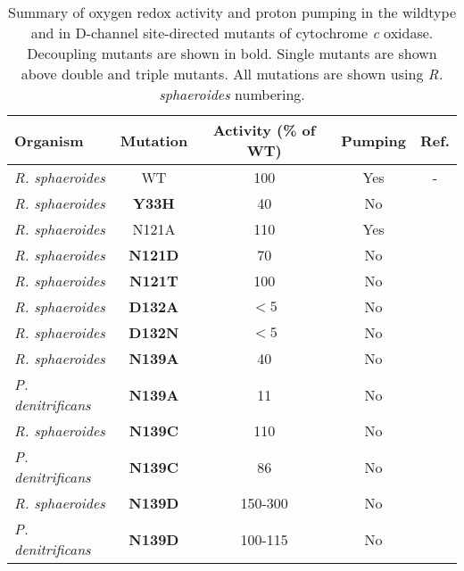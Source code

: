 \begin{table}
    \begin{center}
    \begin{singlespaced}
    \caption{Summary of oxygen redox activity and proton pumping in the wildtype and in D-channel site-directed mutants of cytochrome \emph{c} oxidase. Decoupling mutants are shown in bold. Single mutants are shown above double and triple mutants. All mutations are shown using \emph{R. sphaeroides} numbering.}
    \vspace{10pt}
    \label{tbl:dchannel_mutations}
    \footnotesize{
    \begin{tabular}{l|c|c|c|c}
    Organism  & Mutation & Activity (\% of WT) & Pumping & Ref. \\
    \hline
    \emph{R. sphaeroides} & WT & 100 & Yes & - \\
    \emph{R. sphaeroides} & \textbf{Y33H} & 40 & No & \cite{Namslauer:2010p9850} \\
    \emph{R. sphaeroides} & N121A & 110 & Yes & \cite{Zhu:2010p8237} \\
    \emph{R. sphaeroides} & \textbf{N121D} & 70 & No & \cite{Zhu:2010p8237} \\
    \emph{R. sphaeroides} & \textbf{N121T} & 100 & No & \cite{Zhu:2010p8237} \\
    \emph{R. sphaeroides} & \textbf{D132A} & $<5$ & No & \cite{Mills:2000p4585,Fetter:1995p6852} \\
    \emph{R. sphaeroides} & \textbf{D132N} & $<5$ & No & \cite{Mills:2000p4585} \\
    \emph{R. sphaeroides} & \textbf{N139A} & 40 & No & \cite{Zhu:2010p8237} \\
    \emph{P. denitrificans} & \textbf{N139A} & 11 & No & \cite{Durr:2008p6162} \\
    \emph{R. sphaeroides} & \textbf{N139C} & 110 & No & \cite{Zhu:2010p8237} \\
    \emph{P. denitrificans} & \textbf{N139C} & 86 & No & \cite{Durr:2008p6162} \\
    \emph{R. sphaeroides} & \textbf{N139D} & 150-300 & No & \cite{Pawate:2002p5614,Namslauer:2003p6853} \\
    \emph{P. denitrificans} & \textbf{N139D} & 100-115 & No & \cite{Pfitzner:2000p5484} \\

\end{tabular}}
\end{singlespaced}
\end{center}
\end{table}
